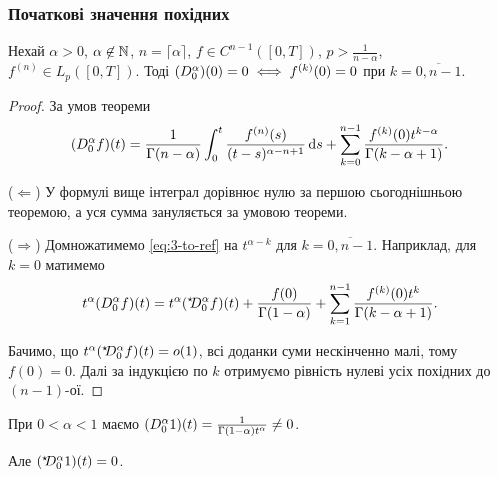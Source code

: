 \subsubsection{Початкові значення похідних}

\begin{theorem}
    Нехай $\alpha > 0$, $\alpha \not\in \mathbb{N}$, $n = \lceil \alpha \rceil$, $f \in C^{n - 1}([0, T])$, $p > \frac{1}{n - \alpha}$, $f^{(n)} \in L_p([0, T])$. Тоді $(D_0^{\alpha}) (0) = 0 \iff f^{(k)} (0) = 0$ при $k = \overline{0, n - 1}$.
\end{theorem}

\begin{proof}
    За умов теореми
    \begin{equation}
        \label{eq:3-to-ref}
        (D_0^{\alpha} f)(t) = \frac{1}{\Gamma(n - \alpha)} \int_0^t \frac{f^{(n)}(s)}{(t - s)^{\alpha - n + 1}} \mathop{}\!\mathrm{d} s + \sum_{k = 0}^{n - 1} \frac{f^{(k)}(0) t^{k - \alpha}}{\Gamma(k - \alpha + 1)}.
    \end{equation}

    ($\Longleftarrow$) У формулі вище інтеграл дорівнює нулю за першою сьогоднішньою теоремою, а уся сумма зануляється за умовою теореми. \medskip

    ($\Longrightarrow$) Домножатимемо \eqref{eq:3-to-ref} на $t^{\alpha - k}$ для $k = \overline{0, n - 1}$. Наприклад, для $k = 0$ матимемо
    \begin{equation}
        t^\alpha (D_0^{\alpha} f)(t) = t^\alpha ({}^{\star\!\!}D_0^{\alpha} f)(t) + \frac{f(0)}{\Gamma(1 - \alpha)} + \sum_{k = 1}^{n - 1} \frac{f^{(k)}(0) t^k}{\Gamma(k - \alpha + 1)}.
    \end{equation}

    Бачимо, що $t^\alpha ({}^{\star\!\!}D_0^{\alpha} f)(t) = o(1)$, всі доданки суми нескінченно малі, тому $f(0) = 0$. Далі за індукцією по $k$ отримуємо рівність нулеві усіх похідних до $(n - 1)$-ої.
\end{proof}

\begin{remark}
    При $0 < \alpha < 1$ маємо $(D_0^{\alpha} 1)(t) = \frac{1}{\Gamma(1 - \alpha) t^\alpha} \ne 0$.
\end{remark}

\begin{remark}
    Але $({}^{\star\!\!}D_0^{\alpha} 1)(t) = 0$.
\end{remark}

